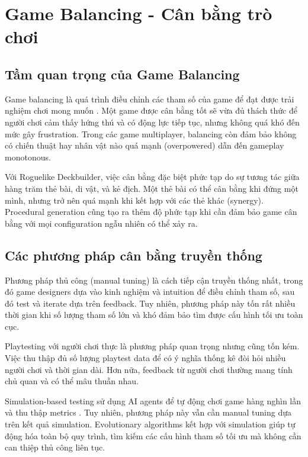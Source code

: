 \section{Game Balancing - Cân bằng trò chơi}

\subsection{Tầm quan trọng của Game Balancing}

Game balancing là quá trình điều chỉnh các tham số của game để đạt được trải nghiệm chơi mong muốn \cite{schell2019art}. Một game được cân bằng tốt sẽ vừa đủ thách thức để người chơi cảm thấy hứng thú và có động lực tiếp tục, nhưng không quá khó đến mức gây frustration. Trong các game multiplayer, balancing còn đảm bảo không có chiến thuật hay nhân vật nào quá mạnh (overpowered) dẫn đến gameplay monotonous.

Với Roguelike Deckbuilder, việc cân bằng đặc biệt phức tạp do sự tương tác giữa hàng trăm thẻ bài, di vật, và kẻ địch. Một thẻ bài có thể cân bằng khi đứng một mình, nhưng trở nên quá mạnh khi kết hợp với các thẻ khác (synergy). Procedural generation cũng tạo ra thêm độ phức tạp khi cần đảm bảo game cân bằng với mọi configuration ngẫu nhiên có thể xảy ra.

\subsection{Các phương pháp cân bằng truyền thống}

Phương pháp thủ công (manual tuning) là cách tiếp cận truyền thống nhất, trong đó game designers dựa vào kinh nghiệm và intuition để điều chỉnh tham số, sau đó test và iterate dựa trên feedback. Tuy nhiên, phương pháp này tốn rất nhiều thời gian khi số lượng tham số lớn và khó đảm bảo tìm được cấu hình tối ưu toàn cục.

Playtesting với người chơi thực là phương pháp quan trọng nhưng cũng tốn kém. Việc thu thập đủ số lượng playtest data để có ý nghĩa thống kê đòi hỏi nhiều người chơi và thời gian dài. Hơn nữa, feedback từ người chơi thường mang tính chủ quan và có thể mâu thuẫn nhau.

Simulation-based testing sử dụng AI agents để tự động chơi game hàng nghìn lần và thu thập metrics \cite{jaffe2012optimizing}. Tuy nhiên, phương pháp này vẫn cần manual tuning dựa trên kết quả simulation. Evolutionary algorithms kết hợp với simulation giúp tự động hóa toàn bộ quy trình, tìm kiếm các cấu hình tham số tối ưu mà không cần can thiệp thủ công liên tục.

